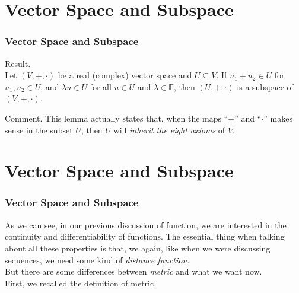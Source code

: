 \documentclass[12pt, t]{beamer}
\renewcommand{\emph}[1]{{\color{Turquoise3}\textsl{#1}}}
\begin{document}
\section{Vector Space and Subspace}
\begin{frame}
    \frametitle{Vector Space and Subspace}
Result.\\
\vspace{1em}
\hspace{1em}
Let $(V,+,\cdot)$ be a real (complex) vector space and $U\subseteq V$. If $u_1+u_2\in U$ for $u_1,u_2\in U$, and $\lambda u\in U$ for all $u\in U$ and $\lambda \in \mathbb{F}$, then $(U,+,\cdot)$ is a 
subspace of $(V,+,\cdot)$.\\
\vspace{1em}
\hspace{1em}

Comment. 
This lemma actually states that, when the maps “$+$” and “$\cdot$” makes sense in the subset $U$, then $U$ will \emph{inherit the eight axioms} of $V$.

\end{frame}

\section{Vector Space and Subspace}
\begin{frame}
    \frametitle{Vector Space and Subspace}
\hspace{1em}
    As we can see, in our previous discussion of function, we are interested in the continuity and differentiability of functions. The essential thing when talking about 
all these properties is that, we again, like when we were discussing sequences, we need some kind of \emph{distance function}.\\
\hspace{1em}
    But there are some differences between \emph{metric} and what we want now.\\
\hspace{1em}
    First, we recalled the definition of metric.\\
    
\end{frame}
\end{document}
